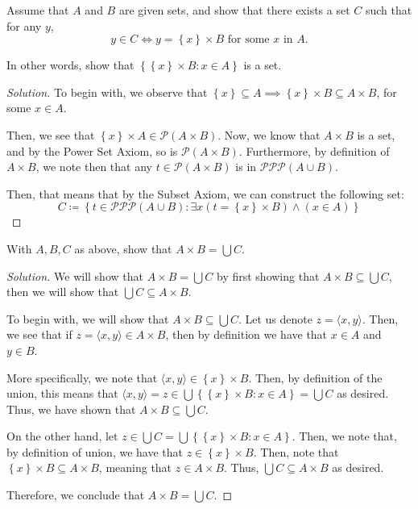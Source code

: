 \documentclass{article}
\newenvironment{solution}{\begin{proof}[Solution]}{\end{proof}}
\newcommand{\brc}[1]{ \left\{  {#1} \right\}}
\newcommand{\ang}[1]{\langle {#1} \rangle}
\begin{document}
	\setcounter{subsection}{5}
	\setcounter{ahw}{0}
	\begin{ahw}
		Assume that $A$ and $B$ are given sets, and show that there exists a set $C$ such that for any $y$,
		\begin{equation*}
			y \in C \iff y = \brc{x} \times B \text{ for some $x$ in $A$}.
		\end{equation*}
		
		In other words, show that $\brc{ \brc{x} \times B : x \in A}$ is a set.
	\end{ahw}
	\begin{solution}
		To begin with, we observe that $\brc{x} \subseteq A \implies \brc{x} \times B \subseteq A \times B$, for some $x \in A$.
		
		Then, we see that $\brc{x} \times A \in \mathscr{P}(A \times B)$. Now, we know that $A \times B$ is a set, and by the Power Set Axiom, so is $\mathscr{P}(A \times B)$. Furthermore, by definition of $A \times B$, we note then that any $t \in \mathscr{P}(A \times B)$ is in $\mathscr{P}\mathscr{P}\mathscr{P}(A \cup B)$.
		
		Then, that means that by the Subset Axiom, we can construct the following set:
		\begin{equation*}
			C \coloneq \brc{t \in \mathscr{P}\mathscr{P}\mathscr{P}(A \cup B) : \exists x(t = \brc{x} \times B) \land (x \in A)}
		\end{equation*}
	\end{solution}
	
	\begin{ahw}
		With $A, B, C$ as above, show that $A \times B = \bigcup C$.
	\end{ahw}
	\begin{solution}
		We will show that $A \times B = \bigcup C$ by first showing that $A \times B \subseteq \bigcup C$, then we will show that $\bigcup C \subseteq A \times B$.
		
		To begin with, we will show that $A \times B \subseteq \bigcup C$. Let us denote $z = \ang{x,y}$. Then, we see that if $z = \ang{x,y} \in A \times B$, then by definition we have that $x \in A$ and $y \in B$.
		
		More specifically, we note that $\ang{x,y} \in \brc{x} \times B$. Then, by definition of the union, this means that $\ang{x,y} = z \in \bigcup \brc{ \brc{x} \times B : x \in A} = \bigcup C$ as desired. Thus, we have shown that $A \times B \subseteq \bigcup C$.
		
		On the other hand, let $z \in \bigcup C = \bigcup \brc{ \brc{x} \times B : x \in A}$. Then, we note that, by definition of union, we have that $z \in \brc{x} \times B$. Then, note that $\brc{x} \times B \subseteq A \times B$, meaning that $z \in A \times B$. Thus, $\bigcup C \subseteq A \times B$ as desired.
		
		Therefore, we conclude that $A \times B = \bigcup C$. 
	\end{solution}
	
\end{document}
